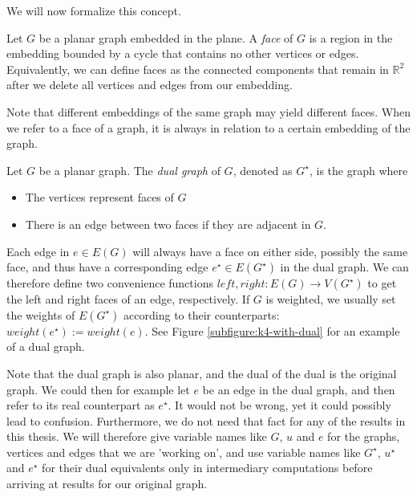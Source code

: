 We will now formalize this concept.

\begin{definition}[Face]
    Let $G$ be a planar graph embedded in the plane. A \emph{face} of $G$ is a region in the embedding bounded by a cycle that contains no other vertices or edges. Equivalently, we can define faces as the connected components that remain in $\mathbb{R}^2$ after we delete all vertices and edges from our embedding. 

    Note that different embeddings of the same graph may yield different faces. When we refer to a face of a graph, it is always in relation to a certain embedding of the graph.
\end{definition}

\begin{definition}
    Let $G$ be a planar graph. The \emph{dual graph} of $G$, denoted as $G^\star$, is the graph where 
    \begin{itemize}
        \item The vertices represent faces of $G$
        \item There is an edge between two faces if they are adjacent in $G$.
    \end{itemize}
\end{definition}

Each edge in $e \in E(G)$ will always have a face on either side, possibly the same face, and thus have a corresponding edge $e^\star \in E(G^\star)$ in the dual graph. We can therefore define two convenience functions $left, right : E(G) \rightarrow V(G^\star)$ to get the left and right faces of an edge, respectively. If $G$ is weighted, we usually set the weights of $E(G^\star)$ according to their counterparts: $weight(e^\star) := weight(e)$. See Figure \ref{subfigure:k4-with-dual} for an example of a dual graph.

Note that the dual graph is also planar, and the dual of the dual is the original graph. We could then for example let $e$ be an edge in the dual graph, and then refer to its real counterpart as $e^\star$. It would not be wrong, yet it could possibly lead to confusion. Furthermore, we do not need that fact for any of the results in this thesis. We will therefore give variable names like $G$, $u$ and $e$ for the graphs, vertices and edges that we are 'working on', and use variable names like $G^\star$, $u^\star$ and $e^\star$ for their dual equivalents only in intermediary computations before arriving at results for our original graph.

